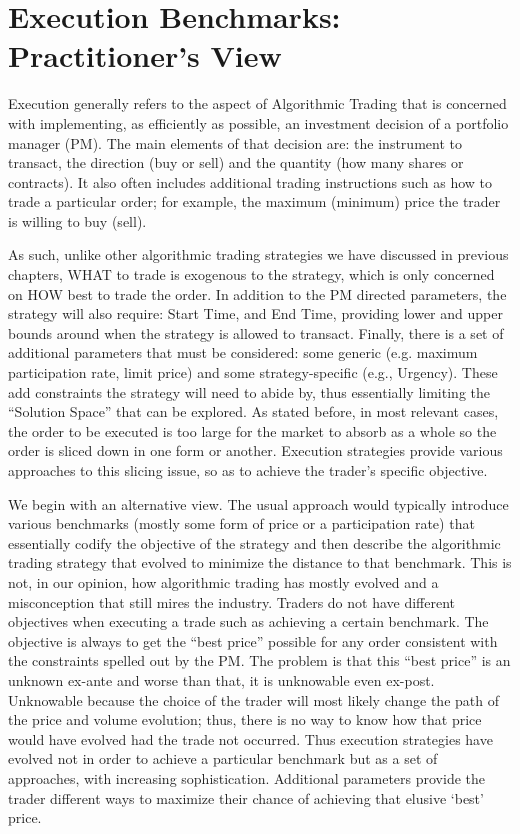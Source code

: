 \section{Execution Benchmarks: Practitioner's View\label{sec:exec_bench_prac_view}}

Execution generally refers to the aspect of Algorithmic Trading that is concerned with  implementing, as efficiently as possible, an investment decision of a portfolio manager (PM). The main elements of that decision are: the instrument to transact, the direction (buy or sell) and the quantity (how many shares or contracts). It also often includes additional trading instructions such as how to trade a particular order; for example, the maximum (minimum) price the trader is willing to buy (sell). 


As such, unlike other algorithmic trading strategies we have discussed in previous chapters, WHAT to trade is exogenous to the strategy, which is only concerned on HOW best to trade the order. In addition to the PM directed parameters, the strategy will also require: Start Time, and End Time, providing lower and upper bounds around when the strategy is allowed to transact. Finally, there is a set of additional parameters that must be considered: some generic (e.g. maximum participation rate, limit price) and some strategy-specific (e.g., Urgency). These add constraints the strategy will need to abide by, thus essentially limiting the ``Solution Space'' that can be explored. As stated before, in most relevant cases, the order to be executed is too large for the market to absorb as a whole so the order is sliced down in one form or another. Execution strategies provide various approaches to this slicing issue, so as to achieve the trader's specific objective.


We begin with an alternative view. The usual approach would typically introduce various benchmarks (mostly some form of price or a participation rate) that essentially codify the objective of the strategy and then describe the algorithmic trading strategy that evolved to minimize the distance to that benchmark. This is not, in our opinion, how algorithmic trading has mostly evolved and a misconception that still mires the industry. Traders do not have different objectives when executing a trade such as achieving a certain benchmark. The objective is always to get the ``best price'' possible for any order consistent with the constraints spelled out by the PM. The problem is that this ``best price''  is an unknown ex-ante and worse than that, it is unknowable even ex-post. Unknowable because the choice of the trader will most likely change the path of the price and volume evolution; thus, there is no way to know how that price would have evolved had the trade not occurred. Thus execution strategies have evolved not in order to achieve a particular benchmark but as a set of approaches, with increasing sophistication. Additional parameters provide the trader different ways to maximize their chance of achieving that elusive `best' price. \twomedskip



